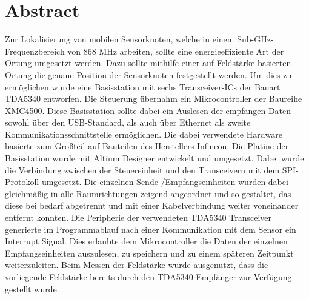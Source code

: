 \newpage
\chapter*{Abstract}
\label{sec:abstract}
\pagestyle{scrheadings}

Zur Lokalisierung von mobilen Sensorknoten, welche in einem Sub-GHz-Frequenzbereich von 868 MHz arbeiten, sollte eine energieeffiziente Art der Ortung umgesetzt werden. Dazu sollte mithilfe einer auf Feldstärke basierten Ortung die genaue Position der Sensorknoten festgestellt werden. Um dies zu ermöglichen wurde eine Basisstation mit sechs Transceiver-ICs der Bauart TDA5340 entworfen. Die Steuerung übernahm ein Mikrocontroller der Baureihe XMC4500. Diese Basisstation sollte dabei ein Auslesen der empfangen Daten  sowohl über den USB-Standard, als auch über Ethernet als zweite Kommunikationsschnittstelle ermöglichen. Die dabei verwendete Hardware basierte zum Großteil auf Bauteilen des Herstellers Infineon. 
Die Platine der Basisstation wurde mit Altium Designer entwickelt und umgesetzt. Dabei wurde die  Verbindung zwischen der Steuereinheit und den Transceivern mit dem SPI-Protokoll umgesetzt. Die einzelnen Sende-/Empfangseinheiten wurden dabei gleichmäßig in alle Raumrichtungen zeigend angeordnet und so gestaltet, das diese bei bedarf abgetrennt und mit einer Kabelverbindung weiter voneinander entfernt konnten.
Die Peripherie der verwendeten TDA5340 Transceiver generierte im Programmablauf nach einer Kommunikation mit dem Sensor ein Interrupt Signal. Dies erlaubte dem Mikrocontroller die Daten der einzelnen Empfangseinheiten auszulesen, zu speichern und zu einem späteren Zeitpunkt weiterzuleiten. Beim Messen der Feldstärke wurde ausgenutzt, dass die vorliegende Feldstärke bereits durch den TDA5340-Empfänger zur Verfügung gestellt wurde.